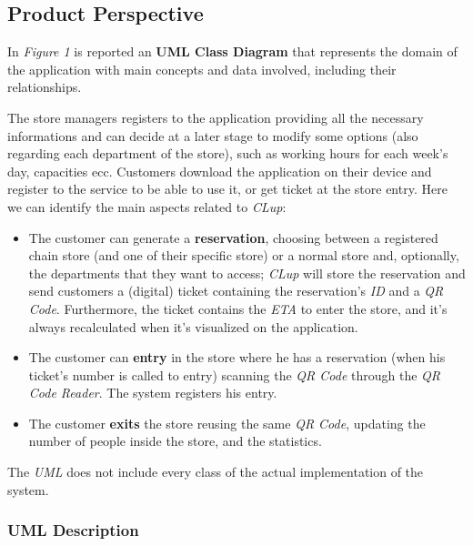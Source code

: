 \documentclass{article}
\begin{document}
	\subsection{Product Perspective}
	
	
	In \emph{Figure 1} is reported an {\bfseries UML Class Diagram} that represents the domain of the application with main concepts and data involved, including their relationships.
	
	The store managers registers to the application providing all the necessary informations and can decide at a later stage to modify some options (also regarding each department of the store), such as working hours for each week's day, capacities ecc. Customers download the application on their device and register to the service to be able to use it, or get ticket at the store entry. Here we can identify the main aspects related to \emph{CLup}:
	
	\begin{itemize}
		
		\item The customer can generate a {\bfseries reservation}, choosing between a registered chain store (and one of their specific store) or a normal store and, optionally, the departments that they want to access; \emph{CLup} will store the reservation and send customers a (digital) ticket containing the reservation's \emph{ID} and a \emph{QR Code}. Furthermore, the ticket contains the \emph{ETA} to enter the store, and it's always recalculated when it's visualized on the application.
		
		\item The customer can {\bfseries entry} in the store where he has a reservation (when his ticket's number is called to entry) scanning the \emph{QR Code} through the \emph{QR Code Reader}. The system registers his entry.
		
		\item The customer {\bfseries exits} the store reusing the same \emph{QR Code}, updating the number of people inside the store, and the statistics.
		
	\end{itemize}

	The \emph{UML} does not include every class of the actual implementation of the system.
		
		\subsubsection{UML Description}
		
\end{document}
